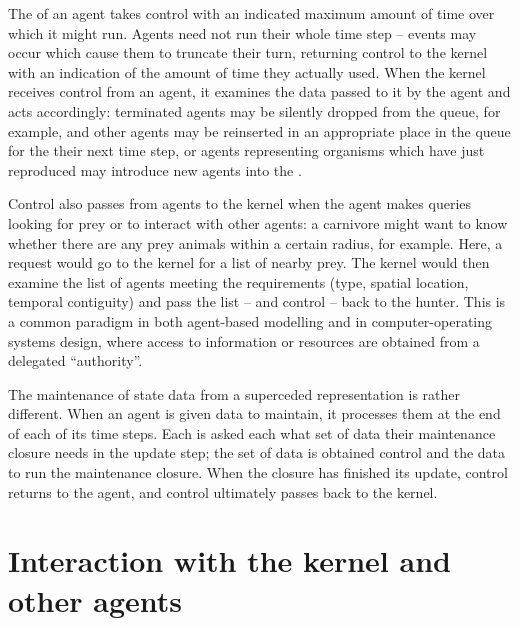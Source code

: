 The  of an agent takes control with an indicated
maximum amount of time over which it might run.  Agents need not run
their whole time step -- events may occur which cause them to truncate
their turn, returning control to the kernel with an indication of the
amount of time they actually used.  When the kernel receives control
from an agent, it examines the data passed to it by the agent and acts
accordingly: terminated agents may be silently dropped from the queue,
for example, and other agents may be reinserted in an appropriate
place in the queue for the their next time step, or agents
representing organisms which have just reproduced may introduce new
agents into the .

Control also passes from agents to the kernel when the agent makes
queries looking for prey or to interact with other agents: a carnivore
might want to know whether there are any prey animals within a certain
radius, for example.  Here, a request would go to the kernel for a
list of nearby prey.  The kernel would then examine the list of agents
meeting the requirements (type, spatial location, temporal contiguity)
and pass the list -- and control -- back to the hunter.  This is a
common paradigm in both agent-based modelling and in
computer-operating systems design, where access to information or
resources are obtained from a delegated ``authority''.

The maintenance of state data from a superceded representation is
rather different. When an agent is given data to maintain, it
processes them at the end of each of its time steps. Each is asked each
what set of data their maintenance closure needs in the update step;
the set of data is obtained control and the data to run the maintenance
closure. When the closure has finished its update, control returns to
the agent, and control ultimately passes back to the kernel.


\section{Interaction with the kernel and other agents}
